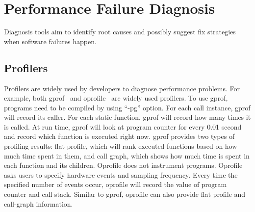 \section{Performance Failure Diagnosis}
\label{sec:2_diagnosis}
Diagnosis tools aim to identify root causes and possibly suggest fix strategies when 
software failures happen. 

\subsection{Profilers}
Profilers are widely used by developers to diagnose performance problems. 
For example, both gprof~\citep{gprof} and oprofile~\citep{oprofile} are
widely used profilers.
To use gprof, programs need to be compiled by using ``-pg'' option. 
For each call instance, gprof will record its caller. For each static function, 
gprof will record how many times it is called. 
At run time, gprof will look at program counter for every 0.01 second and record 
which function is executed right now. 
gprof provides two types of profiling results: 
flat profile, which will rank executed functions based on how much time spent in them, 
and call graph, which shows how much time is spent in each function and its 
children. 
Oprofile does not instrument programs. 
Oprofile asks users to specify hardware events and sampling frequency. 
Every time the specified number of events occur, 
oprofile will record the value of program counter and call stack. 
Similar to gprof, oprofile can also provide flat profile and call-graph information. 

